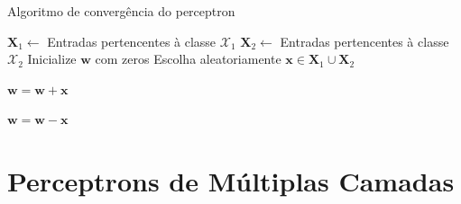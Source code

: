   \begin{algorithm}
    \caption{Algoritmo de convergência do perceptron} 
    \begin{algorithmic}[1]
      \State $\textbf{X}_1\leftarrow$ Entradas pertencentes à classe $\mathscr{X}_1$
      \State $\textbf{X}_2\leftarrow$ Entradas pertencentes à classe $\mathscr{X}_2$
      \State Inicialize $\textbf{w}$ com zeros
      \State Escolha aleatoriamente $\textbf{x}\in\textbf{X}_1\cup \textbf{X}_2$ 

      \State $\textbf{w} = \textbf{w} + \textbf{x}$
      \EndIf

      \State $\textbf{w} = \textbf{w} -  \textbf{x}$
      \EndIf

      \EndWhile
    \end{algorithmic} 
  \end{algorithm}

  \section{Perceptrons de Múltiplas Camadas}




